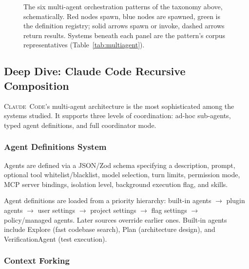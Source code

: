 \documentclass[11pt,a4paper]{article}
\newcommand{\clcode}{\textsc{Claude~Code}\xspace}
\begin{document}
\begin{figure}[H]
\begin{minipage}[t]{0.32\textwidth}
\end{minipage}
\caption{The six multi-agent orchestration patterns of the taxonomy above, schematically. Red nodes spawn, blue nodes are spawned, green is the definition registry; solid arrows spawn or invoke, dashed arrows return results. Systems beneath each panel are the pattern's corpus representatives (Table~\ref{tab:multiagent}).}
\label{fig:ma_patterns}
\end{figure}

\subsection{Deep Dive: Claude Code Recursive Composition}
\label{sec:cc_multiagent}

\clcode{}'s multi-agent architecture is the most sophisticated among the systems studied.
It supports three levels of coordination: ad-hoc sub-agents, typed agent definitions, and full coordinator mode.

\subsubsection{Agent Definitions System}

Agents are defined via a JSON/Zod schema specifying a description, prompt, optional tool whitelist/blacklist, model selection, turn limits, permission mode, MCP server bindings, isolation level, background execution flag, and skills.

Agent definitions are loaded from a priority hierarchy: built-in agents $\to$ plugin agents $\to$ user settings $\to$ project settings $\to$ flag settings $\to$ policy/managed agents.
Later sources override earlier ones.
Built-in agents include Explore (fast codebase search), Plan (architecture design), and VerificationAgent (test execution).

\subsubsection{Context Forking}
\end{document}
